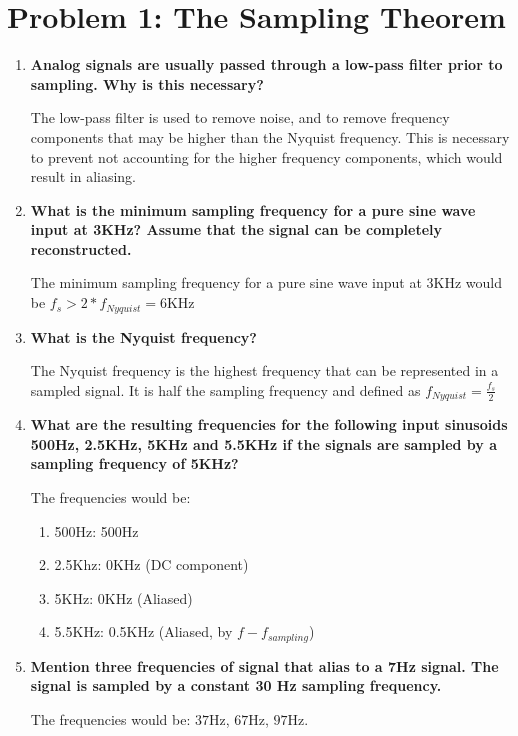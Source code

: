\section{Problem 1: The Sampling Theorem}
\begin{enumerate}
      \item {\bf Analog signals are usually passed through a low-pass filter prior to sampling. Why is this necessary?}

            The low-pass filter is used to remove noise, and to remove frequency components that may be higher than the Nyquist frequency. This is necessary to prevent not accounting for the higher frequency components, which would result in aliasing.

      \item {\bf What is the minimum sampling frequency for a pure sine wave input at 3KHz? Assume that the signal can be completely reconstructed.}

            The minimum sampling frequency for a pure sine wave input at 3KHz would be $f_s > 2 * f_{Nyquist} = 6\text{KHz}$

      \item {\bf What is the Nyquist frequency?}

            The Nyquist frequency is the highest frequency that can be represented in a sampled signal. It is half the sampling frequency and defined as $f_{Nyquist} = \frac{f_s}{2}$

      \item {\bf What are the resulting frequencies for the following input sinusoids 500Hz, 2.5KHz, 5KHz and 5.5KHz if the signals are sampled by a sampling frequency of 5KHz?}

            The frequencies would be:
            \begin{enumerate}
                  \item 500Hz: 500Hz
                  \item 2.5Khz: 0KHz (DC component)
                  \item 5KHz: 0KHz (Aliased)
                  \item 5.5KHz: 0.5KHz (Aliased, by $f - f_{sampling}$)
            \end{enumerate}

      \item {\bf Mention three frequencies of signal that alias to a 7Hz signal. The signal is sampled by a constant 30 Hz sampling frequency.}

            The frequencies would be: $37$Hz, $67$Hz, $97$Hz.
\end{enumerate}

